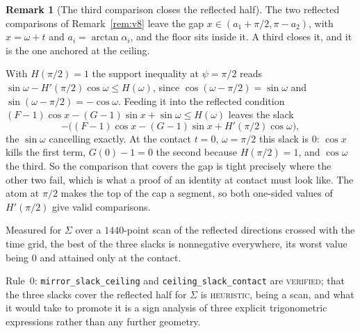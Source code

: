 \documentclass[11pt]{article}
\theoremstyle{definition}
\newtheorem{remark}[theorem]{Remark}
\newcommand{\Sig}{\Sigma}
\begin{document}
\begin{remark}[The third comparison closes the reflected half]\label{rem:v11}
The two reflected comparisons of Remark~\ref{rem:v8} leave the gap
$x\in(a_1+\pi/2,\pi-a_2)$, with $x=\omega+t$ and $a_i=\arctan\alpha_i$, and the floor sits
inside it. A third closes it, and it is the one anchored at the ceiling.

With $H(\pi/2)=1$ the support inequality at $\psi=\pi/2$ reads
$\sin\omega-H'(\pi/2)\cos\omega\le H(\omega)$, since $\cos(\omega-\pi/2)=\sin\omega$ and
$\sin(\omega-\pi/2)=-\cos\omega$. Feeding it into the reflected condition
$(F-1)\cos x-(G-1)\sin x+\sin\omega\le H(\omega)$ leaves the slack
\[
  -\bigl((F-1)\cos x-(G-1)\sin x+H'(\pi/2)\cos\omega\bigr),
\]
the $\sin\omega$ cancelling exactly. At the contact $t=0$, $\omega=\pi/2$ this slack is $0$:
$\cos x$ kills the first term, $G(0)-1=0$ the second because $H(\pi/2)=1$, and $\cos\omega$
the third. So the comparison that covers the gap is tight precisely where the other two
fail, which is what a proof of an identity at contact must look like. The atom at $\pi/2$
makes the top of the cap a segment, so both one-sided values of $H'(\pi/2)$ give valid
comparisons.

Measured for $\Sig$ over a $1440$-point scan of the reflected directions crossed with the
time grid, the best of the three slacks is nonnegative everywhere, its worst value being $0$
and attained only at the contact.

Rule~0: \verb|mirror_slack_ceiling| and \verb|ceiling_slack_contact| are \textsc{verified};
that the three slacks cover the reflected half for $\Sig$ is \textsc{heuristic}, being a
scan, and what it would take to promote it is a sign analysis of three explicit
trigonometric expressions rather than any further geometry.
\end{remark}
\end{document}
